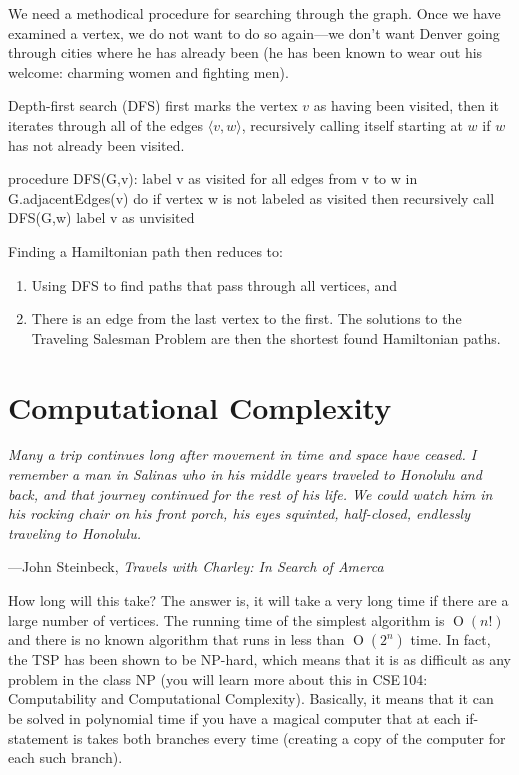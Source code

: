 \documentclass[11pt]{article}
\begin{document}
We need a methodical procedure for searching through the graph. Once we
have examined a vertex, we do not want to do so again---we don't want
Denver going through cities where he has already been (he has been known
to wear out his welcome: charming women and fighting men).

Depth-first search (DFS) first marks the vertex $v$ as having been visited,
then it iterates through all of the edges $\langle v, w \rangle$,
recursively calling itself starting at $w$ if $w$ has not already been
visited.

\begin{codelisting}{}
procedure DFS(G,v):
    label v as visited
    for all edges from v to w in G.adjacentEdges(v) do
       if vertex w is not labeled as visited then
          recursively call DFS(G,w)
    label v as unvisited
\end{codelisting}

Finding a Hamiltonian path then reduces to:
\begin{enumerate}
\item
Using DFS to find paths that pass through all vertices, and
\item
There is an edge from the last vertex to the first. The solutions to the
Traveling Salesman Problem are then the shortest found Hamiltonian
paths.
\end{enumerate}

\section{Computational Complexity}

\textwidth \epigraph{\emph{Many a trip continues long
    after movement in time and space have ceased. I remember a man in
    Salinas who in his middle years traveled to Honolulu and back, and
    that journey continued for the rest of his life. We could watch him
    in his rocking chair on his front porch, his eyes squinted,
    half-closed, endlessly traveling to Honolulu.}}{---John Steinbeck,
    \emph{Travels with Charley: In Search of Amerca}}

How long will this take?
The answer is, it will take a very long time if there are a large number
of vertices. The running time of the simplest algorithm is
$\operatorname{O}(n!)$ and there is no known algorithm that runs in less
than $\operatorname{O}(2^n)$ time.  In fact, the TSP has been shown to
be NP-hard, which means that it is as difficult as any problem in the
class NP (you will learn more about this in CSE\,104: Computability and
Computational Complexity).  Basically, it means that it can be solved in
polynomial time if you have a magical computer that at each if-statement
is takes both branches every time (creating a copy of the computer for
each such branch).
\end{document}
